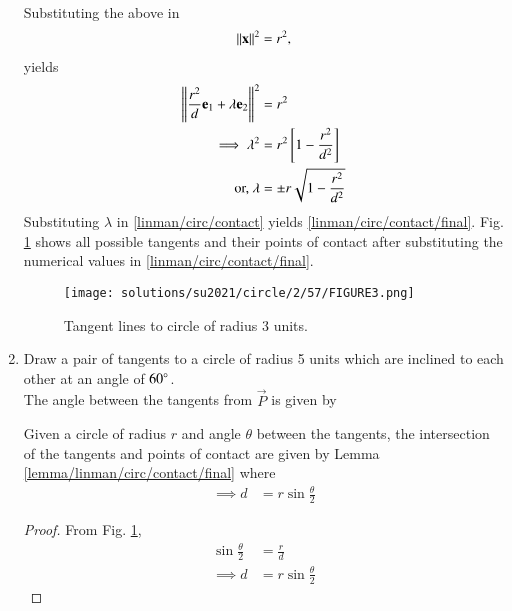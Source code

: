 \begin{enumerate}[label=\thesubsection.\arabic*.,ref=\thesubsection.\theenumi]
\begin{align}
  \label{linman/circ/contact}
 \end{align}
 Substituting the above in 
 \begin{align}
  \left\lVert\mathbf{x}\right\rVert^2 = r^2,
 \end{align}
 yields
\begin{align}
\left\lVert\frac{r^2}{d}\mathbf{e}_1 + \lambda \mathbf{e}_2\right\rVert^2&=r^2
\\
\implies \lambda^2 &= r^2{}\left[1 - \frac{r^2}{d^2}\right]
\\
\text{or, }\lambda &= \pm r\sqrt{1 - \frac{r^2}{d^2}}
\end{align}
%
Substituting $\lambda $ in \eqref{linman/circ/contact} yields \eqref{linman/circ/contact/final}.  Fig.  \ref{fig:Tangent lines to circle of radius 3 units.} shows all possible tangents
and their points of contact after substituting the numerical values in \eqref{linman/circ/contact/final}.
%
\begin{figure}[ht]
  \centering
  \texttt{[image: solutions/su2021/circle/2/57/FIGURE3.png]}
  \caption{Tangent lines to circle of radius 3 units.}
  \label{fig:Tangent lines to circle of radius 3 units.}
\end{figure}
%
\item Draw a  pair of tangents to a circle of radius 5 units  which are inclined to each other at an angle of $60\degree$.
\\
\solution  The angle between the tangents from $\vec{P}$ is given by 
\begin{lemma}
  Given a circle of radius $r$ and angle $\theta$ between the tangents, the intersection of the tangents and points of contact are
  given by Lemma   \ref{lemma/linman/circ/contact/final}  where 
  \begin{align}
    \implies d &= r\sin \frac{\theta}{2}
  \end{align}
%  
\end{lemma}
\begin{proof}
  From Fig.  \ref{fig:Tangent lines to circle of radius 3 units.},
\begin{align}
  \sin \frac{\theta}{2} &= \frac{r}{d}
  \\
  \implies d &= r\sin \frac{\theta}{2}
\end{align}
\end{proof}
\end{enumerate}
